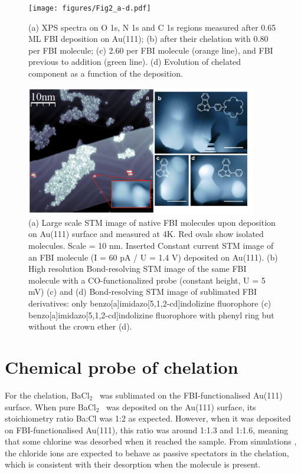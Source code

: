 \documentclass[aps,prl,reprint,longbibliography,superscriptaddress, english]{revtex4-1}
\def\BappCl{BaCl$_2$ }
\begin{document}
\begin{figure}[ht!]
	\texttt{[image: figures/Fig2\_a-d.pdf]}
	\caption{\label{XPS_FBI_Au} 
    (a) XPS spectra on O 1s, N 1s and C 1s regions measured after 0.65 ML FBI deposition on Au(111); (b) after their chelation with 0.80 \Bapp per FBI molecule; (c) 2.60 \Nap per FBI molecule (orange line), and FBI previous to \Nap addition (green line). (d) Evolution of chelated component as a function of the \Bapp deposition.}
\end{figure}  
\begin{figure}[ht!]
	\includegraphics[width=0.9\textwidth]{figures/fig3_STM.pdf}
	\caption{\label{FIG_BRSTM} 
    (a) Large scale STM image of native FBI molecules upon deposition on Au(111) surface and measured at 4K. Red ovals show isolated molecules. Scale = 10 nm. Inserted Constant current STM image of an FBI molecule (I = 60 pA / U = 1.4 V) deposited on Au(111). (b) High resolution Bond-resolving STM image of the same FBI molecule with a CO-functionalized probe (constant height, U = 5 mV) (c) and (d) Bond-resolving STM image of sublimated FBI derivatives: only benzo[a]imidazo[5,1,2-cd]indolizine fluorophore (c) benzo[a]imidazo[5,1,2-cd]indolizine fluorophore with phenyl ring but without the crown ether (d).}
\end{figure}

\section{Chemical probe of chelation}

For the chelation, \BappCl\ was sublimated on the FBI-functionalised Au(111) surface. When pure \BappCl\ was deposited on the Au(111) surface, its stoichiometry ratio Ba:Cl was 1:2 as expected. However, when it was deposited on {FBI-functionalised} Au(111), this ratio was around 1:1.3 and 1:1.6, meaning that some chlorine was desorbed when it reached the sample. From simulations \cite{rivilla_fluorescent_2020}, the {chloride ions are} expected to behave as {passive spectators} in the chelation, {which} is consistent {with their desorption} when the molecule is present.
\end{document}

